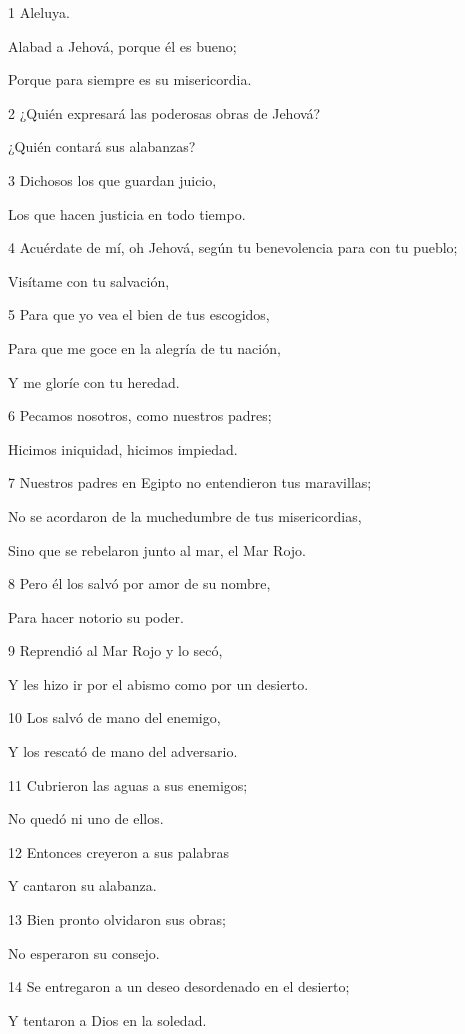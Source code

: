 \par 1 Aleluya.
\par Alabad a Jehová, porque él es bueno;
\par Porque para siempre es su misericordia.
\par 2 ¿Quién expresará las poderosas obras de Jehová?
\par ¿Quién contará sus alabanzas?
\par 3 Dichosos los que guardan juicio,
\par Los que hacen justicia en todo tiempo.
\par 4 Acuérdate de mí, oh Jehová, según tu benevolencia para con tu pueblo;
\par Visítame con tu salvación,
\par 5 Para que yo vea el bien de tus escogidos,
\par Para que me goce en la alegría de tu nación,
\par Y me gloríe con tu heredad.
\par 6 Pecamos nosotros, como nuestros padres;
\par Hicimos iniquidad, hicimos impiedad.
\par 7 Nuestros padres en Egipto no entendieron tus maravillas;
\par No se acordaron de la muchedumbre de tus misericordias,
\par Sino que se rebelaron junto al mar, el Mar Rojo.
\par 8 Pero él los salvó por amor de su nombre,
\par Para hacer notorio su poder.
\par 9 Reprendió al Mar Rojo y lo secó,
\par Y les hizo ir por el abismo como por un desierto.
\par 10 Los salvó de mano del enemigo,
\par Y los rescató de mano del adversario.
\par 11 Cubrieron las aguas a sus enemigos;
\par No quedó ni uno de ellos.
\par 12 Entonces creyeron a sus palabras
\par Y cantaron su alabanza.
\par 13 Bien pronto olvidaron sus obras;
\par No esperaron su consejo.
\par 14 Se entregaron a un deseo desordenado en el desierto;
\par Y tentaron a Dios en la soledad.
